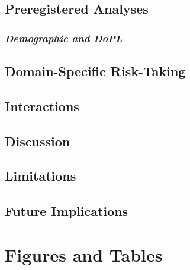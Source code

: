 \documentclass[
  donotrepeattitle,doc, 12pt, a4paper,floatsintext]{apa7}
\begin{document}
\hypertarget{preregistered-analyses-2}{%
\subsection{Preregistered Analyses}\label{preregistered-analyses-2}}

\hypertarget{demographic-and-dopl-2}{%
\subsubsection{\texorpdfstring{\emph{Demographic and DoPL}}{Demographic and DoPL}}\label{demographic-and-dopl-2}}

\hypertarget{domain-specific-risk-taking-2}{%
\subsection{Domain-Specific Risk-Taking}\label{domain-specific-risk-taking-2}}

\hypertarget{interactions-2}{%
\subsection{Interactions}\label{interactions-2}}

\hypertarget{discussion-2}{%
\subsection{Discussion}\label{discussion-2}}

\hypertarget{limitations-1}{%
\subsection{Limitations}\label{limitations-1}}

\hypertarget{future-implications-1}{%
\subsection{Future Implications}\label{future-implications-1}}

\newpage

\hypertarget{figures-and-tables}{%
\section{Figures and Tables}\label{figures-and-tables}}
\end{document}

